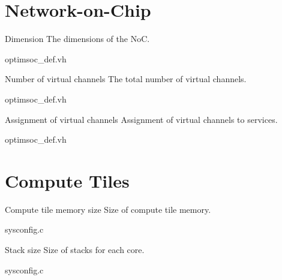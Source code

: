 \section{Network-on-Chip}

\begin{sysconfigbox}{Dimension}
The dimensions of the NoC.
\begin{sysconfigboxref}{optimsoc\_def.vh}
\end{sysconfigboxref}
\end{sysconfigbox}

\begin{sysconfigbox}{Number of virtual channels}
The total number of virtual channels.
\begin{sysconfigboxref}{optimsoc\_def.vh}
\end{sysconfigboxref}
\end{sysconfigbox}

\begin{sysconfigbox}{Assignment of virtual channels}
Assignment of virtual channels to services.
\begin{sysconfigboxref}{optimsoc\_def.vh}
\end{sysconfigboxref}
\end{sysconfigbox}

\section{Compute Tiles}

\begin{sysconfigbox}{Compute tile memory size}
Size of compute tile memory.
\begin{sysconfigboxref}{sysconfig.c}
\end{sysconfigboxref}
\end{sysconfigbox}

\begin{sysconfigbox}{Stack size}
Size of stacks for each core.
\begin{sysconfigboxref}{sysconfig.c}
\end{sysconfigboxref}
\end{sysconfigbox}

